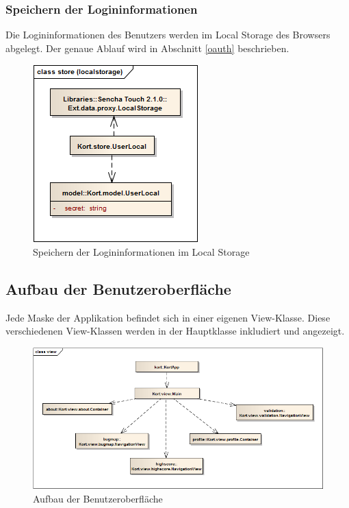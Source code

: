 \subsubsection{Speichern der Logininformationen}
Die Logininformationen des Benutzers werden im \gls{Local Storage} des Browsers abgelegt.
Der genaue Ablauf wird in Abschnitt \ref{oauth} beschrieben.

\begin{figure}[H]
	\centering
	\includegraphics[scale=0.6]{images/uml/kort-classdiagram-store_localstorage}
	\caption{Speichern der Logininformationen im Local Storage}
	\label{image-kort-classdiagram-store_localstorage}
\end{figure}

\subsection{Aufbau der Benutzeroberfläche}
Jede Maske der Applikation befindet sich in einer eigenen View-Klasse.
Diese verschiedenen View-Klassen werden in der Hauptklasse  inkludiert und angezeigt.

\begin{figure}[H]
	\centering
	\includegraphics[width=\textwidth]{images/uml/kort-classdiagram-view}
	\caption{Aufbau der Benutzeroberfläche}
	\label{image-kort-classdiagram-view}
\end{figure}